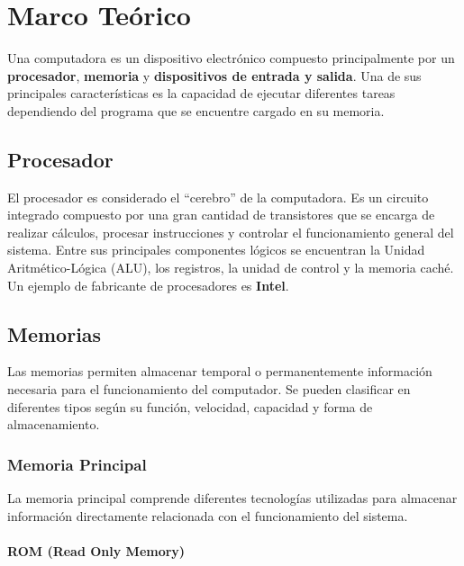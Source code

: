 \documentclass[10pt]{article}
\begin{document}
\newpage
\tableofcontents
\thispagestyle{plain}
\clearpage


\section{Marco Teórico}

Una computadora es un dispositivo electrónico compuesto principalmente por un \textbf{procesador}, \textbf{memoria} y \textbf{dispositivos de entrada y salida}. Una de sus principales características es la capacidad de ejecutar diferentes tareas dependiendo del programa que se encuentre cargado en su memoria.

\subsection{Procesador}

El procesador es considerado el ``cerebro'' de la computadora. Es un circuito integrado compuesto por una gran cantidad de transistores que se encarga de realizar cálculos, procesar instrucciones y controlar el funcionamiento general del sistema. Entre sus principales componentes lógicos se encuentran la Unidad Aritmético-Lógica (ALU), los registros, la unidad de control y la memoria caché. Un ejemplo de fabricante de procesadores es \textbf{Intel}.

\subsection{Memorias}

Las memorias permiten almacenar temporal o permanentemente información necesaria para el funcionamiento del computador. Se pueden clasificar en diferentes tipos según su función, velocidad, capacidad y forma de almacenamiento.

\subsubsection{Memoria Principal}

La memoria principal comprende diferentes tecnologías utilizadas para almacenar información directamente relacionada con el funcionamiento del sistema.

\paragraph{ROM (Read Only Memory)}
\end{document}
